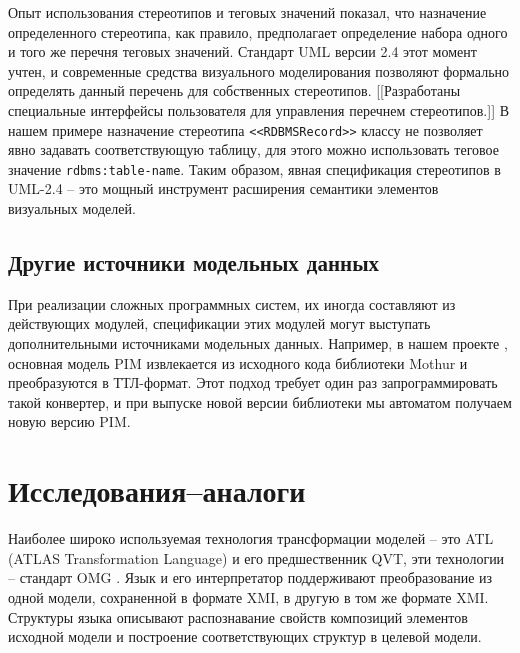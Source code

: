 \documentclass[conference]{IEEEtran} \IEEEoverridecommandlockouts
\begin{document}
Опыт использования стереотипов и теговых значений показал, что назначение определенного стереотипа, как правило, предполагает определение набора одного и того же перечня теговых значений. Стандарт UML версии 2.4 этот момент учтен, и современные средства визуального моделирования позволяют формально определять данный перечень для собственных стереотипов. [[Разработаны специальные интерфейсы пользователя для управления перечнем стереотипов.]] В нашем примере назначение стереотипа \texttt{<<RDBMSRecord>>} классу не позволяет явно задавать соответствующую таблицу, для этого можно использовать теговое значение \texttt{rdbms:table-name}. Таким образом, явная спецификация стереотипов в UML-2.4 -- это мощный инструмент расширения семантики элементов визуальных моделей. 

\subsection{Другие источники модельных данных} \label{sec:other-models} 

При реализации сложных программных систем, их иногда составляют из действующих модулей, спецификации этих модулей могут выступать дополнительными источниками модельных данных. Например, в нашем проекте \cite{bit2019}, основная модель PIM извлекается из исходного кода библиотеки Mothur и преобразуются в ТТЛ-формат. Этот подход требует один раз запрограммировать такой конвертер, и при выпуске новой версии библиотеки мы автоматом получаем новую версию PIM. 

\section{Исследования--аналоги} 

Наиболее широко используемая технология трансформации моделей -- это ATL (ATLAS Transformation Language) \cite{atl} и его предшественник QVT, эти технологии -- стандарт OMG \cite{QVT}. Язык и его интерпретатор поддерживают преобразование из одной модели, сохраненной в формате XMI, в другую в том же формате XMI. Структуры языка описывают распознавание свойств композиций элементов исходной модели и построение соответствующих структур в целевой модели. 
\end{document}
